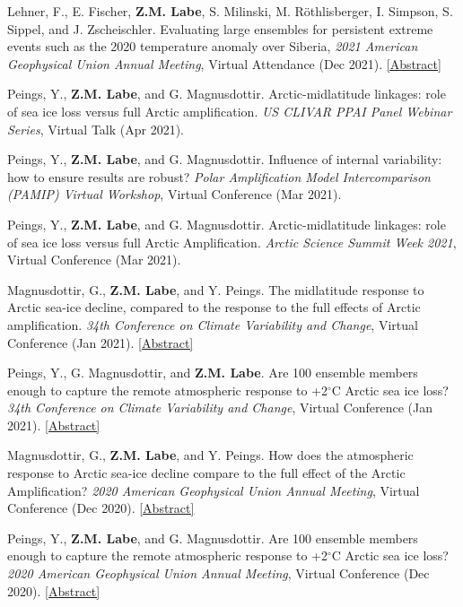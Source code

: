 \documentclass[margin,line,palatino,courier,10pt]{res}
\begin{document}
\begin{resume}
\begin{etaremune}[leftmargin=0in,topsep=0in,parsep=0in]
\item Lehner, F., E. Fischer, \textbf{Z.M. Labe}, S. Milinski, M. R\"{o}thlisberger, I. Simpson, S. Sippel, and J. Zscheischler. Evaluating large ensembles for persistent extreme events such as the 2020 temperature anomaly over Siberia, \textit{2021 American Geophysical Union Annual Meeting}, Virtual Attendance (Dec 2021). \href{https://agu.confex.com/agu/fm21/meetingapp.cgi/Paper/944312}{[Abstract]}
\item Peings, Y., \textbf{Z.M. Labe}, and G. Magnusdottir. Arctic-midlatitude linkages: role of sea ice loss versus full Arctic amplification. \textit{US CLIVAR PPAI Panel Webinar Series}, Virtual Talk (Apr 2021).
\item Peings, Y., \textbf{Z.M. Labe}, and G. Magnusdottir. Influence of internal variability: how to ensure results are robust? \textit{Polar Amplification Model Intercomparison (PAMIP) Virtual Workshop}, Virtual Conference (Mar 2021).
\item Peings, Y., \textbf{Z.M. Labe}, and G. Magnusdottir. Arctic-midlatitude linkages: role of sea ice loss versus full Arctic Amplification. \textit{Arctic Science Summit Week 2021}, Virtual Conference (Mar 2021).
\item Magnusdottir, G., \textbf{Z.M. Labe}, and Y. Peings. The midlatitude response to Arctic sea-ice decline, compared to the response to the full effects of Arctic amplification. \textit{34th Conference on Climate Variability and Change}, Virtual Conference (Jan 2021). \href{https://ams.confex.com/ams/101ANNUAL/meetingapp.cgi/Paper/382356}{[Abstract]}
\item Peings, Y., G. Magnusdottir, and \textbf{Z.M. Labe}. Are 100 ensemble members enough to capture the remote atmospheric response to +2$^{\circ}$C Arctic sea ice loss? \textit{34th Conference on Climate Variability and Change}, Virtual Conference (Jan 2021). \href{https://ams.confex.com/ams/101ANNUAL/meetingapp.cgi/Paper/382352}{[Abstract]}
\item Magnusdottir, G., \textbf{Z.M. Labe}, and Y. Peings. How does the atmospheric response to Arctic sea-ice decline compare to the full effect of the Arctic Amplification? \textit{2020 American Geophysical Union Annual Meeting}, Virtual Conference (Dec 2020). \href{https://agu.confex.com/agu/fm20/meetingapp.cgi/Paper/678706}{[Abstract]}
\item Peings, Y., \textbf{Z.M. Labe}, and G. Magnusdottir. Are 100 ensemble members enough to capture the remote atmospheric response to +2$^{\circ}$C Arctic sea ice loss? \textit{2020 American Geophysical Union Annual Meeting}, Virtual Conference (Dec 2020). \href{https://agu.confex.com/agu/fm20/meetingapp.cgi/Paper/685885}{[Abstract]}

\end{etaremune}
\end{resume}
\end{document}
